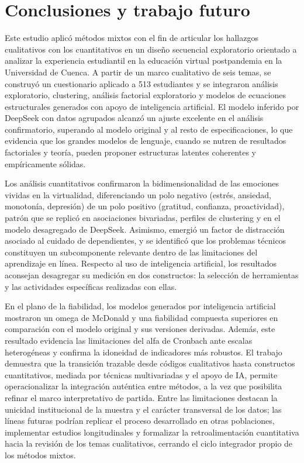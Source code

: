 \documentclass[conference]{IEEEtran}
\begin{document}

\section{Conclusiones y trabajo futuro}
\label{sec:conclusiones}

Este estudio aplicó métodos mixtos con el fin de articular los hallazgos cualitativos con los cuantitativos en un diseño secuencial exploratorio orientado a analizar la experiencia estudiantil en la educación virtual postpandemia en la Universidad de Cuenca. A partir de un marco cualitativo de seis temas, se construyó un cuestionario aplicado a 513 estudiantes y se integraron análisis exploratorio, clustering, análisis factorial exploratorio y modelos de ecuaciones estructurales generados con apoyo de inteligencia artificial. El modelo inferido por DeepSeek con datos agrupados alcanzó un ajuste excelente en el análisis confirmatorio, superando al modelo original y al resto de especificaciones, lo que evidencia que los grandes modelos de lenguaje, cuando se nutren de resultados factoriales y teoría, pueden proponer estructuras latentes coherentes y empíricamente sólidas.

Los análisis cuantitativos confirmaron la bidimensionalidad de las emociones vividas en la virtualidad, diferenciando un polo negativo (estrés, ansiedad, monotonía, depresión) de un polo positivo (gratitud, confianza, proactividad), patrón que se replicó en asociaciones bivariadas, perfiles de clustering y en el modelo desagregado de DeepSeek. Asimismo, emergió un factor de distracción asociado al cuidado de dependientes, y se identificó que los problemas técnicos constituyen un subcomponente relevante dentro de las limitaciones del aprendizaje en línea. Respecto al uso de inteligencia artificial, los resultados aconsejan desagregar su medición en dos constructos: la selección de herramientas y las actividades específicas realizadas con ellas.

En el plano de la fiabilidad, los modelos generados por inteligencia artificial mostraron un omega de McDonald y una fiabilidad compuesta superiores en comparación con el modelo original y sus versiones derivadas. Además, este resultado evidencia las limitaciones del alfa de Cronbach ante escalas heterogéneas y confirma la idoneidad de indicadores más robustos. El trabajo demuestra que la transición trazable desde códigos cualitativos hasta constructos cuantitativos, mediada por técnicas multivariadas y el apoyo de IA, permite operacionalizar la integración auténtica entre métodos, a la vez que posibilita refinar el marco interpretativo de partida. Entre las limitaciones destacan la unicidad institucional de la muestra y el carácter transversal de los datos; las líneas futuras podrían replicar el proceso desarrollado en otras poblaciones, implementar estudios longitudinales y formalizar la retroalimentación cuantitativa hacia la revisión de los temas cualitativos, cerrando el ciclo integrador propio de los métodos mixtos.
\end{document}

